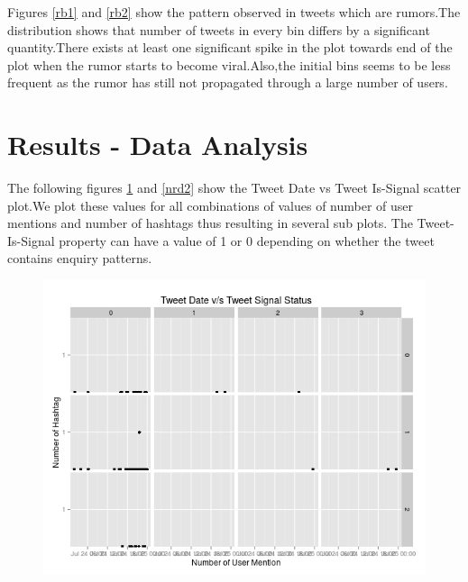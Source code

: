    Figures \ref{rb1} and \ref{rb2} show the pattern observed in tweets which are rumors.The distribution shows that number of tweets in every bin differs by a significant quantity.There exists at least one significant spike in the plot towards end of the plot when the rumor starts to become viral.Also,the initial bins seems to be less frequent as the rumor has still not propagated through a large number of users.
  	

\section{Results - Data Analysis }

  The following figures \ref{nrd1} and \ref{nrd2} show the Tweet Date vs Tweet Is-Signal scatter plot.We plot these values for all combinations of values of number of user mentions and number of hashtags thus resulting in several sub plots.
  The Tweet-Is-Signal property can have a value of 1 or 0 depending on whether the tweet contains enquiry patterns.
 
\begin{figure}[H]
	\centering
	\begin{minipage}{.7\linewidth}
		\includegraphics[width=\linewidth]{images/qp_nrumor1.jpeg}
		\label{nrd1}
	\end{minipage}
\end{figure}

